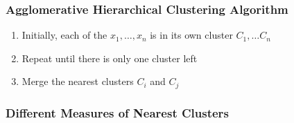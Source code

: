 \documentclass[letterpaper,12pt]{article}
\begin{document}
\subsubsection{Agglomerative Hierarchical Clustering Algorithm}
\begin{enumerate}
 \item Initially, each of the $x_1, \dots, x_n$ is in its own cluster $C_1, \dots C_n$
 \item Repeat until there is only one cluster left
 \item \quad\quad Merge the nearest clusters $C_i$ and $C_j$
\end{enumerate}


\subsubsection{Different Measures of Nearest Clusters}
\end{document}
